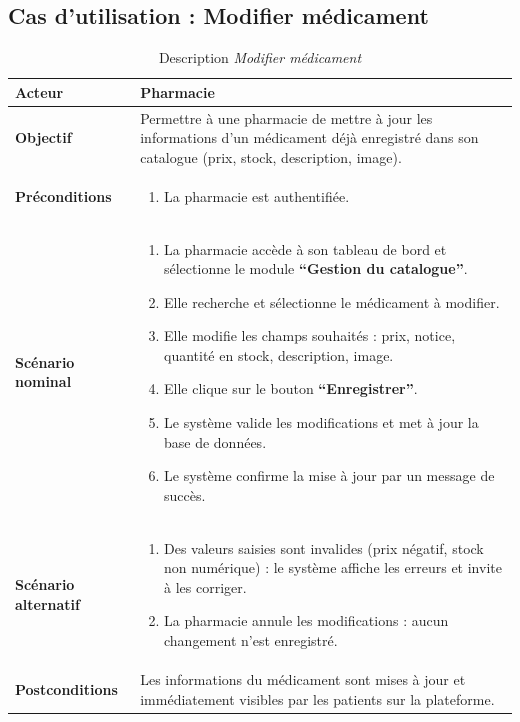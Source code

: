 \documentclass[12pt,a4paper]{report}
\begin{document}
\subsection*{Cas d'utilisation : Modifier médicament}

\begin{table}[H]
    \centering
    \begin{tabular}{|p{4cm}|p{9cm}|}
        \hline
        \textbf{Acteur} & Pharmacie \\
        \hline
        \textbf{Objectif} & Permettre à une pharmacie de mettre à jour les informations d'un médicament déjà enregistré dans son catalogue (prix, stock, description, image). \\
        \hline
        \textbf{Préconditions} &
        \begin{enumerate}
            \item La pharmacie est authentifiée.
        \end{enumerate} \\
        \hline
        \textbf{Scénario nominal} &
        \begin{enumerate}
            \item La pharmacie accède à son tableau de bord et sélectionne le module \textbf{``Gestion du catalogue''}.
            \item Elle recherche et sélectionne le médicament à modifier.
            \item Elle modifie les champs souhaités : prix, notice, quantité en stock, description, image.
            \item Elle clique sur le bouton \textbf{``Enregistrer''}.
            \item Le système valide les modifications et met à jour la base de données.
            \item Le système confirme la mise à jour par un message de succès.
        \end{enumerate} \\
        \hline
        \textbf{Scénario alternatif} &
        \begin{enumerate}
            \item[4.a] Des valeurs saisies sont invalides (prix négatif, stock non numérique) : le système affiche les erreurs et invite à les corriger.
            \item[4.b] La pharmacie annule les modifications : aucun changement n'est enregistré.
        \end{enumerate} \\
        \hline
        \textbf{Postconditions} & Les informations du médicament sont mises à jour et immédiatement visibles par les patients sur la plateforme. \\
        \hline
    \end{tabular}
    \caption{Description \textit{Modifier médicament}}
\end{table}
\end{document}
